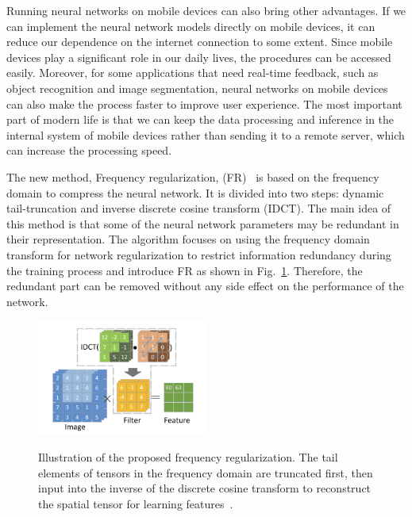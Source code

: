 \documentclass{article}
\begin{document}
Running neural networks on mobile devices can also bring other advantages. If we can implement the neural network models directly on mobile devices, it can reduce our dependence on the internet connection to some extent. Since mobile devices play a significant role in our daily lives, the procedures can be accessed easily. Moreover, for some applications that need real-time feedback, such as object recognition and image segmentation, neural networks on mobile devices can also make the process faster to improve user experience. The most important part of modern life is that we can keep the data processing and inference in the internal system of mobile devices rather than sending it to a remote server, which can increase the processing speed.

The new method, Frequency regularization, (FR)~\cite{zhao2023frequency} is based on the frequency domain to compress the neural network. It is divided into two steps: dynamic tail-truncation and inverse discrete cosine transform (IDCT). The main idea of this method is that some of the neural network parameters may be redundant in their representation. The algorithm focuses on using the frequency domain transform for network regularization to restrict information redundancy during the training process and introduce FR as shown in Fig.~\ref{idct}. Therefore, the redundant part can be removed without any side effect on the performance of the network.

\begin{figure}
	\vspace{-15pt}    %
	\includegraphics[width=0.5\textwidth]{figure/idct.png}\\
	\vspace{-15pt}    %
	\caption{Illustration of the proposed frequency regularization. The tail elements of tensors in the frequency domain are truncated first, then input into the inverse of the discrete cosine transform to reconstruct the spatial tensor for learning features~\cite{zhao2023frequency}.}
	\label{idct}
	\vspace{-15pt}    %
\end{figure}
\end{document}
